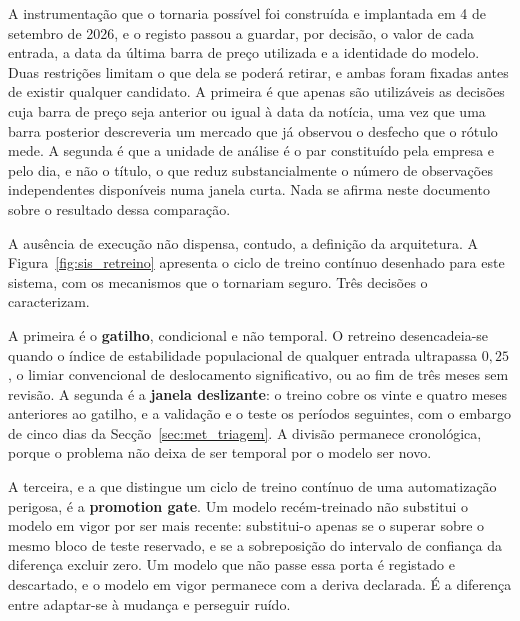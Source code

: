 A instrumentação que o tornaria possível foi construída e implantada em 4 de setembro de 2026, e
o registo passou a guardar, por decisão, o valor de cada entrada, a data da última barra de preço
utilizada e a identidade do modelo. Duas restrições limitam o que dela se poderá retirar, e ambas
foram fixadas antes de existir qualquer candidato. A primeira é que apenas são utilizáveis as
decisões cuja barra de preço seja anterior ou igual à data da notícia, uma vez que uma barra
posterior descreveria um mercado que já observou o desfecho que o rótulo mede. A segunda é que a
unidade de análise é o par constituído pela empresa e pelo dia, e não o título, o que reduz
substancialmente o número de observações independentes disponíveis numa janela curta. Nada se
afirma neste documento sobre o resultado dessa comparação.

A ausência de execução não dispensa, contudo, a definição da arquitetura. A
Figura~\ref{fig:sis_retreino} apresenta o ciclo de treino contínuo desenhado para este sistema, com
os mecanismos que o tornariam seguro. Três decisões o caracterizam.

A primeira é o \textbf{gatilho}, condicional e não temporal. O retreino desencadeia-se quando o
índice de estabilidade populacional de qualquer entrada ultrapassa $0{,}25$, o limiar convencional
de deslocamento significativo, ou ao fim de três meses sem revisão. A segunda é a \textbf{janela
deslizante}: o treino cobre os vinte e quatro meses anteriores ao gatilho, e a validação e o teste
os períodos seguintes, com o embargo de cinco dias da Secção~\ref{sec:met_triagem}. A divisão
permanece cronológica, porque o problema não deixa de ser temporal por o modelo ser novo.

A terceira, e a que distingue um ciclo de treino contínuo de uma automatização perigosa, é a
\textbf{promotion gate}. Um modelo recém-treinado não substitui o modelo em vigor por ser mais
recente: substitui-o apenas se o superar sobre o mesmo bloco de teste reservado, e se a
sobreposição do intervalo de confiança da diferença excluir zero. Um modelo que não passe essa
porta é registado e descartado, e o modelo em vigor permanece com a deriva declarada. É a diferença
entre adaptar-se à mudança e perseguir ruído.

